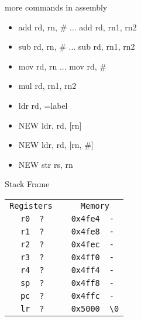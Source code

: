 




\begin{frame}{more commands in assembly}


    \begin{itemize}
        \item add rd, rn, # ... add rd, rn1, rn2
        \item sub rd, rn, # ... sub rd, rn1, rn2
        \item mov rd, rn ... mov rd, #
        \item mul rd, rn1, rn2
        \item ldr rd, =label
       \item NEW ldr, rd, [rn]
        \item NEW ldr, rd, [rn, #]
        \item NEW str rs, rn
    \end{itemize}
    
    
    \end{frame}

    




\begin{frame}{Stack Frame}
    \begin{alltt}
        \begin{tabular}{ r | l p{5mm} r | l }
            \multicolumn{2}{c}{Registers} && \multicolumn{2}{c}{Memory} \\
            r0 & ? && 0x4fe4 & - \\
            r1 & ? && 0x4fe8 & - \\
            r2 & ? && 0x4fec & - \\
            r3 & ? && 0x4ff0 & - \\
            r4 & ? && 0x4ff4 & - \\
            sp & ? && 0x4ff8 & - \\
            pc & ? && 0x4ffc & - \\
            lr & ? && 0x5000 & {\textbackslash}0 \\
            \end{tabular}
        \end{alltt}
    \end{frame}
